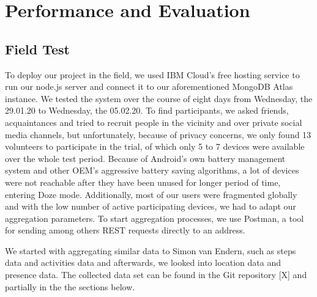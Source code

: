 
\chapter{Performance and Evaluation}\label{chapter:evaluation}
\section{Field Test}
To deploy our project in the field, we used IBM Cloud's free hosting service to run our node.js server and connect it to our aforementioned MongoDB Atlas instance. We tested the system over the course of eight days from Wednesday, the 29.01.20 to Wednesday, the 05.02.20. To find participants, we asked friends, acquaintances and tried to recruit people in the vicinity and over private social media channels, but unfortunately, because of privacy concerns, we only found 13 volunteers to participate in the trial, of which only 5 to 7 devices were available over the whole test period. Because of Android's own battery management system and other OEM's aggressive battery saving algorithms, a lot of devices were not reachable after they have been unused for longer period of time, entering Doze mode. Additionally, most of our users were fragmented globally and with the low number of active participating devices, we had to adapt our aggregation parameters. To start aggregation processes, we use Postman, a tool for sending among others REST requests directly to an address.

We started with aggregating similar data to Simon van Endern, such as steps data and activities data and afterwards, we looked into location data and presence data. The collected data set can be found in the Git repository [X] and partially in the the sections below.
